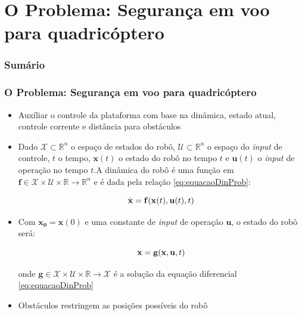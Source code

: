 \documentclass{beamer}
\begin{document}
\section{O Problema: Segurança em voo para quadricóptero}

\begin{frame}
	\frametitle{Sumário}
	\tableofcontents[currentsection]
\end{frame}

\begin{frame}[allowframebreaks]
	\frametitle{O Problema: Segurança em voo para quadricóptero}
	
	\begin{itemize}
		
		\item Auxíliar o controle da plataforma com base na dinâmica, estado  atual, controle corrente e distância para obstáculos
		
		\item Dado $\mathcal{X} \subset \mathbb{R}^{n}$ o espaço de estados do robô, $\mathcal{U} \subset \mathbb{R}^{n}$ o espaço do \textit{input} de controle, $t$ o tempo, $\mathbf{x}(t)$ o estado do robô no tempo $t$ e $\mathbf{u}(t)$ o \textit{input} de operação no tempo $t$.A dinâmica do robô é uma função em $\mathbf{f} \in \mathcal{X} \times \mathcal{U} \times \mathbb{R} \rightarrow \mathbb{R}^{n}$ e é dada pela relação \ref{eq:equacaoDinProb}:
		
		\begin{equation}
		\centering
		\dot{\mathbf{x}} = \mathbf{f}(\mathbf{x}(t),\mathbf{u}(t),t)  
		\label{eq:equacaoDinProb}
		\end{equation}
		
		\item Com $\mathbf{x_0} = \mathbf{x}(0)$ e uma constante de \textit{input} de operação $\mathbf{u}$, o estado do robô será:
		
		\begin{equation}
		\centering
		\mathbf{x} = \mathbf{g}(\mathbf{x},\mathbf{u},t)  
		\label{eq:equacaoPosProb}
		\end{equation}
		
		onde $\mathbf{g} \in \mathcal{X} \times \mathcal{U} \times \mathbb{R} \rightarrow \mathcal{X}$ é a solução da equação diferencial \ref{eq:equacaoDinProb}				
		
	\framebreak
	
		\item Obstáculos restringem as posições possíveis do robô
		

\end{itemize}
\end{frame}
\end{document}
